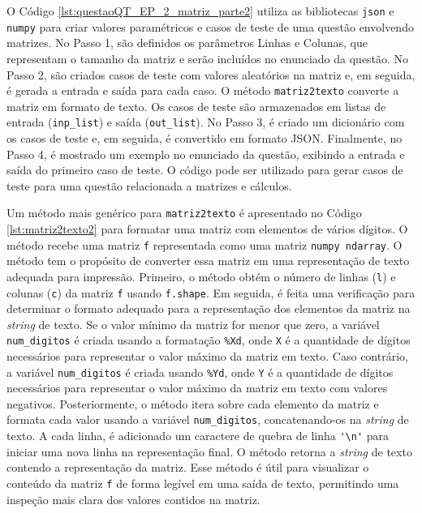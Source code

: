 O Código \ref{lst:questaoQT_EP_2_matriz_parte2} utiliza as bibliotecas \verb|json| e \verb|numpy| para criar valores paramétricos e casos de teste de uma questão envolvendo matrizes. No Passo 1, são definidos os parâmetros Linhas e Colunas, que representam o tamanho da matriz e serão incluídos no enunciado da questão. No Passo 2, são criados casos de teste com valores aleatórios na matriz e, em seguida, é gerada a entrada e saída para cada caso. O método \verb|matriz2texto| converte a matriz em formato de texto. Os casos de teste são armazenados em listas de entrada (\verb|inp_list|) e saída (\verb|out_list|). No Passo 3, é criado um dicionário com os casos de teste e, em seguida, é convertido em formato JSON. Finalmente, no Passo 4, é mostrado um exemplo no enunciado da questão, exibindo a entrada e saída do primeiro caso de teste. O código pode ser utilizado para gerar casos de teste para uma questão relacionada a matrizes e cálculos.

Um método mais genérico para \verb|matriz2texto| é apresentado no Código \ref{lst:matriz2texto2} para formatar uma matriz com elementos de vários dígitos. O método recebe uma matriz \verb|f| representada como uma matriz \verb|numpy ndarray|. O método tem o propósito de converter essa matriz em uma representação de texto adequada para impressão. Primeiro, o método obtém o número de linhas (\verb|l|) e colunas (\verb|c|) da matriz \verb|f| usando \verb|f.shape|. Em seguida, é feita uma verificação para determinar o formato adequado para a representação dos elementos da matriz na \textit{string} de texto. Se o valor mínimo da matriz for menor que zero, a variável \verb|num_digitos| é criada usando a formatação \verb|%Xd|, onde \verb|X| é a quantidade de dígitos necessários para representar o valor máximo da matriz em texto. Caso contrário, a variável \verb|num_digitos| é criada usando \verb|%Yd|, onde \verb|Y| é a quantidade de dígitos necessários para representar o valor máximo da matriz em texto com valores negativos. Posteriormente, o método itera sobre cada elemento da matriz e formata cada valor usando a variável \verb|num_digitos|, concatenando-os na \textit{string} de texto. A cada linha, é adicionado um caractere de quebra de linha \verb|'\n'| para iniciar uma nova linha na representação final. O método retorna a \textit{string} de texto contendo a representação da matriz. Esse método é útil para visualizar o conteúdo da matriz \verb|f| de forma legível em uma saída de texto, permitindo uma inspeção mais clara dos valores contidos na matriz.

